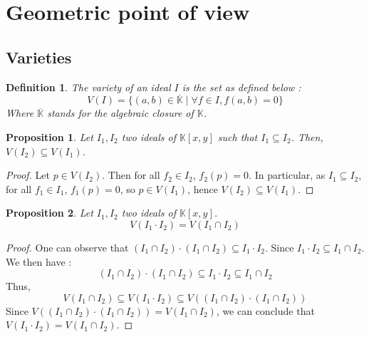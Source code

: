 \documentclass{article}
\newtheorem{definition}{Definition}[section]
\newtheorem{proposition}{Proposition}[section]
\begin{document}
\section{Geometric point of view}

\subsection{Varieties}

\begin{definition}
    The variety of an ideal $I$ is the set as defined below : 
    \begin{displaymath}
        V(I) = \{ (a, b) \in \overline{\mathbb{K}} \mid \forall f \in I, f(a, b) = 0 \}
    \end{displaymath}
    Where $\overline{\mathbb{K}}$ stands for the algebraic closure of $\mathbb{K}$. 
\end{definition}

\begin{proposition}
    Let $I_{1}, I_{2}$ two ideals of $\mathbb{K}[x, y]$ such that $I_{1} \subseteq I_{2}$. Then, $V(I_{2}) \subseteq V(I_{1})$.
\end{proposition}

\begin{proof}
    Let $p \in V(I_{2})$. Then for all $f_{2} \in I_{2}$, $f_{2}(p) = 0$. In particular, as $I_{1} \subseteq I_{2}$, for all $f_{1} \in I_{1}$, $f_{1}(p) = 0$, so $p \in V(I_{1})$, hence $V(I_{2}) \subseteq V(I_{1})$.
\end{proof}

\begin{proposition}
    Let $I_{1}, I_{2}$ two ideals of $\mathbb{K}[x, y]$. 
    \begin{displaymath}
        V(I_{1} \cdot I_{2}) = V(I_{1} \cap I_{2})
    \end{displaymath}
\end{proposition}

\begin{proof}
    One can observe that $(I_{1} \cap I_{2}) \cdot (I_{1} \cap I_{2}) \subseteq I_{1} \cdot I_{2}$. Since $I_{1} \cdot I_{2} \subseteq I_{1} \cap I_{2}$. We then have : 
    \begin{displaymath}
        (I_{1} \cap I_{2}) \cdot (I_{1} \cap I_{2}) \subseteq I_{1} \cdot I_{2} \subseteq I_{1} \cap I_{2}
    \end{displaymath}
    Thus, 
    \begin{displaymath}
        V(I_{1} \cap I_{2}) \subseteq V(I_{1} \cdot I_{2}) \subseteq V((I_{1} \cap I_{2}) \cdot (I_{1} \cap I_{2}))
    \end{displaymath}
    Since $V((I_{1} \cap I_{2}) \cdot (I_{1} \cap I_{2})) = V(I_{1} \cap I_{2})$, we can conclude that $V(I_{1} \cdot I_{2}) = V(I_{1} \cap I_{2})$.
\end{proof}
\end{document}
